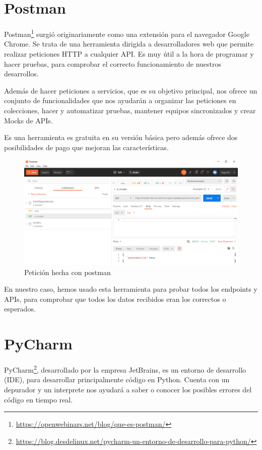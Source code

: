 \section{Postman}\label{sec:postman}

Postman\footnote{\href{https://openwebinars.net/blog/que-es-postman/}{https://openwebinars.net/blog/que-es-postman/}} surgió originariamente como una extensión para el navegador Google Chrome. Se trata de una herramienta dirigida a desarrolladores web que permite realizar peticiones HTTP a cualquier API. Es muy útil a la hora de programar y hacer pruebas, para comprobar el correcto funcionamiento de nuestros desarrollos.

Además de hacer peticiones a servicios, que es su objetivo principal, nos ofrece un conjunto de funcionalidades que nos ayudarán a organizar las peticiones en colecciones, hacer y automatizar pruebas, mantener equipos sincronizados y crear Mocks de APIs.

Es una herramienta es gratuita en su versión básica pero además ofrece dos posibilidades de pago que mejoran las características.
	\begin{figure}[h!]
	\centering
	
	
	\includegraphics[scale=0.6]{Imagenes/Figuras/postman}
	
	
	\caption{Petición hecha con postman}
	\label{fig:postman}
\end{figure}

En nuestro caso, hemos usado esta herramienta para probar todos los endpoints y APIs, para comprobar que todos los datos recibidos eran los correctos o esperados.

\section{PyCharm}

PyCharm\footnote{\href{https://blog.desdelinux.net/pycharm-un-entorno-de-desarrollo-para-python/}{https://blog.desdelinux.net/pycharm-un-entorno-de-desarrollo-para-python/}}, desarrollado por la empresa JetBrains, es un entorno de desarrollo (IDE), para desarrollar principalmente código en Python. Cuenta con un depurador y un interprete nos ayudará a saber o conocer los posibles errores del código en tiempo real. 

